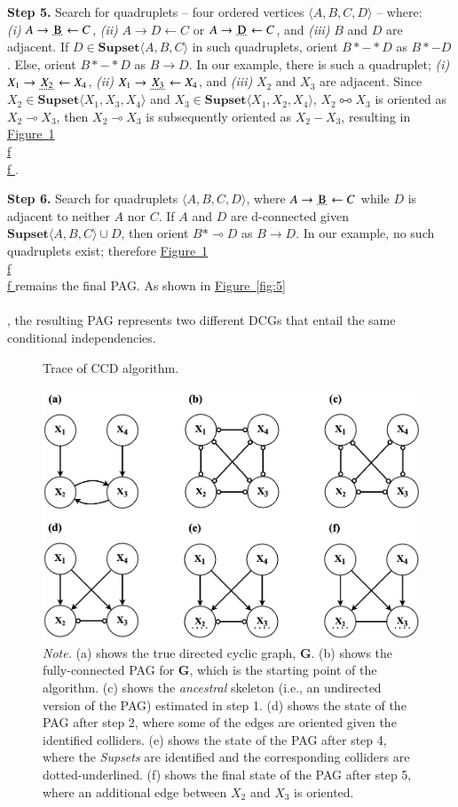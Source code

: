 \documentclass[11pt]{article}
\newcommand{\udensdot}[1]{%
    \tikz[baseline=(todotted.base)]{
        \node[inner sep=1pt,outer sep=0pt] (todotted) {#1};
        \draw[densely dotted, thick] (todotted.south west) -- (todotted.south east);
    }%
}%
\newcommand*{\figref}[2][]{%
  \hyperref[{fig:#2}]{%
    Figure~\ref*{fig:#2}%
    \ifx\\#1\\%
    \else
      #1%
    \fi
  }%
}
\begin{document}
\textbf{Step 5.} Search for quadruplets -- four ordered vertices $\langle A, B, C, D \rangle$ -- where:\\
\textit{(i)} $A \rightarrow \udensdot{B} \leftarrow C$, \textit{(ii)} $A \rightarrow D \leftarrow C$ or $A \rightarrow \udensdot{D} \leftarrow C$, and
\textit{(iii)} $B$ and $D$ are adjacent. 
If $D \in \mathbf{Supset} \langle A, B, C \rangle$ in such quadruplets, orient $B *-* D$ as $B *- D$. Else, orient $B *-* D$ as $B \rightarrow D$. In our example, there is such a quadruplet; \textit{(i)} $X_1 \rightarrow \udensdot{$X_2$} \leftarrow X_4$, \textit{(ii)} $X_1 \rightarrow \udensdot{$X_3$} \leftarrow X_4$, and \textit{(iii)} $X_2$ and $X_3$ are adjacent. Since $X_2 \in \mathbf{Supset} \langle X_1, X_3, X_4 \rangle$ and $X_3 \in \mathbf{Supset} \langle X_1, X_2, X_4 \rangle$, $X_2 \multimapboth X_3$ is oriented as $X_2 \multimap X_3$, then $X_2 \multimap X_3$ is subsequently oriented as  $X_2 - X_3$, resulting in \figref[f]{4}.

\textbf{Step 6.} Search for quadruplets $\langle A, B, C, D \rangle$, where $A \rightarrow \udensdot{B} \leftarrow C$ while $D$ is adjacent to neither $A$ nor $C$. If $A$ and $D$ are d-connected given $\mathbf{Supset} \langle A, B, C \rangle \cup {D}$, then orient $B * \multimap D$ as $B \rightarrow D$. In our example, no such quadruplets exist; therefore \figref[f]{4} remains the final PAG. As shown in \figref{5}, the resulting PAG represents two different DCGs that entail the same conditional independencies. 

\pagebreak
{}

\begin{figure}[H]
    \centering
        \caption{Trace of CCD algorithm.}
        \includegraphics[width=.75\textwidth]{figures/ccdtrace_edited.png}
        \vspace{3mm}
        \caption*{\small{\textit{Note.} (a) shows the true directed cyclic graph, $\boldsymbol{G}$. (b) shows the fully-connected PAG for $\boldsymbol{G}$, which is the starting point of the algorithm. (c) shows the \textit{ancestral} skeleton (i.e., an undirected version of the PAG) estimated in step 1. (d) shows the state of the PAG after step 2, where some of the edges are oriented given the identified colliders. (e) shows the state of the PAG after step 4, where the \textit{Supsets} are identified and the corresponding colliders are dotted-underlined. (f) shows the final state of the PAG after step 5, where an additional edge between $X_2$ and $X_3$ is oriented.}}
    \label{fig:4}
\end{figure}
\end{document}
